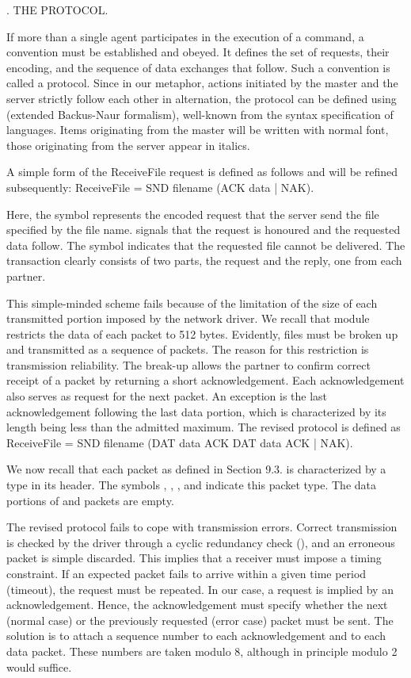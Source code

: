 . THE PROTOCOL.

If more than a single agent participates in the execution of a command, a convention must be established and obeyed. It defines the set of requests, their encoding, and the sequence of data exchanges that follow. Such a convention is called a protocol. Since in our metaphor, actions initiated by the master and the server strictly follow each other in alternation, the protocol can be defined using  (extended Backus-Naur formalism), well-known from the syntax specification of languages. Items originating from the master will be written with normal font, those originating from the server appear in italics.

A simple form of the ReceiveFile request is defined as follows and will be refined subsequently:
\begintt
ReceiveFile = SND filename (ACK data | NAK).
\endtt

\noindent Here, the symbol  represents the encoded request that the server send the file specified by the file name.  signals that the request is honoured and the requested data follow. The  symbol indicates that the requested file cannot be delivered. The transaction clearly consists of two parts, the request and the reply, one from each partner.

This simple-minded scheme fails because of the limitation of the size of each transmitted portion imposed by the network driver. We recall that module  restricts the data of each packet to 512 bytes. Evidently, files must be broken up and transmitted as a sequence of packets. The reason for this restriction is transmission reliability. The break-up allows the partner to confirm correct receipt of a packet by returning a short acknowledgement. Each acknowledgement also serves as request for the next packet. An exception is the last acknowledgement following the last data portion, which is characterized by its length being less than the admitted maximum. The revised protocol is defined as
\begintt
ReceiveFile = SND filename (DAT data ACK {DAT data ACK} | NAK).
\endtt

\noindent We now recall that each packet as defined in Section 9.3. is characterized by a type in its header. The symbols , , , and  indicate this packet type. The data portions of  and  packets are empty.

The revised protocol fails to cope with transmission errors. Correct transmission is checked by the driver through a cyclic redundancy check (), and an erroneous packet is simple discarded. This implies that a receiver must impose a timing constraint. If an expected packet fails to arrive within a given time period (timeout), the request must be repeated. In our case, a request is implied by an acknowledgement. Hence, the acknowledgement must specify whether the next (normal case) or the previously requested (error case) packet must be sent. The solution is to attach a sequence number to each acknowledgement and to each data packet. These numbers are taken modulo 8, although in principle modulo 2 would suffice.

